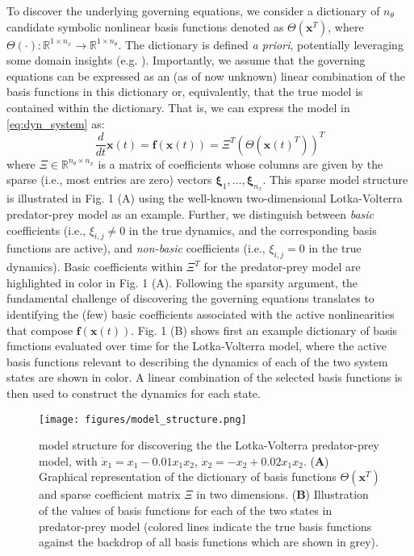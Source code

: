 \documentclass[12pt]{article}
\begin{document}
To discover the underlying governing equations, we consider a dictionary of $n_\theta$ candidate symbolic nonlinear basis functions denoted as $\Theta(\textbf{x}^T)$, where $ \Theta(\cdot): \mathbb{R}^{1\times n_x} \rightarrow \mathbb{R}^{1\times n_\theta}$. The dictionary is defined \textit{a priori}, potentially leveraging some domain insights (e.g. \cite{sun2020alven}). Importantly, we assume that the governing equations can be expressed as an (as of now unknown) linear combination of the basis functions in this dictionary or, equivalently, that the true model is contained within the dictionary. That is, we can express  the model in \eqref{eq:dyn_system} as:
\begin{equation}
\label{eq:dyn_basis}
\frac{d}{dt}\textbf{x}(t) = \textbf{f}(\textbf{x}(t)) = \Xi^T (\Theta (\textbf{x}(t)^T))^T
\end{equation}
where $\Xi \in \mathbb{R}^{n_\theta \times n_x}$ is a matrix of coefficients whose columns are given by the sparse (i.e., most entries are zero) vectors $\pmb{\xi}_1, \dots,\pmb{\xi}_{n_x}$. This sparse model structure is illustrated in Fig. 1 (A) using the well-known two-dimensional Lotka-Volterra predator-prey model as an example. Further, we distinguish between \textit{basic} coefficients (i.e., $\xi_{i,j} \neq 0$ in the true dynamics, and the corresponding basis functions are active), and \textit{non-basic} coefficients (i.e., $\xi_{i,j}=0$ in the true dynamics). Basic coefficients within $\Xi^T$ for the predator-prey model are highlighted in color in Fig. 1 (A). Following the sparsity argument, the fundamental challenge of discovering the governing equations translates to identifying the (few) basic coefficients associated with the active nonlinearities that compose $\textbf{f}(\textbf{x}(t))$. Fig. 1 (B) shows first an example dictionary of basis functions evaluated over time for the Lotka-Volterra model, where the active basis functions relevant to describing the dynamics of  each of the two system states are shown in color. A linear combination of the selected basis functions is then used to construct the  dynamics for each state.


\begin{figure}[h!]
\centering
\texttt{[image: figures/model\_structure.png]}
\caption{\ours{} model structure for discovering the the Lotka-Volterra predator-prey model, with $\dot x_1 = x_1 - 0.01 x_1 x_2$, $\dot x_2 = -x_2 + 0.02 x_1 x_2$. (\textbf{A}) Graphical representation of the dictionary of basis functions $\Theta(\textbf{x}^T)$  and sparse coefficient matrix $\Xi$ in two dimensions. (\textbf{B}) Illustration of the values of basis functions for each of the two states in predator-prey model (colored lines indicate the true basis functions against the backdrop of all basis functions which are shown in grey).}
\label{fig:model_structure}
\end{figure}
\end{document}
